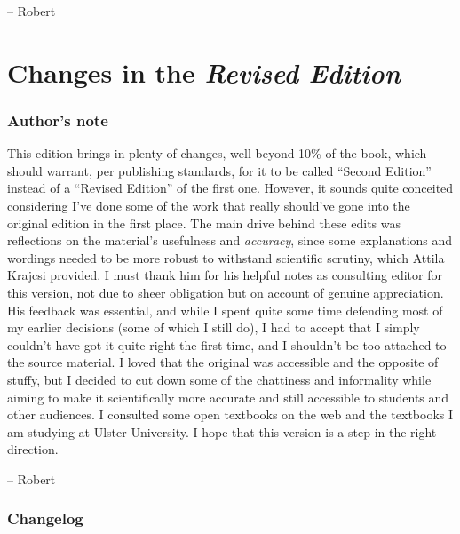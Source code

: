 \documentclass[
  11pt,
]{book}
\theoremstyle{indenteddefinition}
\theoremstyle{indenteddefinition}
\theoremstyle{definition}
\theoremstyle{definition}
\theoremstyle{remark}
\begin{document}
-- Robert

\hypertarget{changes-in-the-revised-edition}{%
\section*{\texorpdfstring{Changes in the \emph{Revised Edition}}{Changes in the Revised Edition}}\label{changes-in-the-revised-edition}}

\hypertarget{authors-note}{%
\subsubsection*{Author's note}\label{authors-note}}

This edition brings in plenty of changes, well beyond 10\% of the book, which should warrant, per publishing standards, for it to be called ``Second Edition'' instead of a ``Revised Edition'' of the first one. However, it sounds quite conceited considering I've done some of the work that really should've gone into the original edition in the first place. The main drive behind these edits was reflections on the material's usefulness and \emph{accuracy}, since some explanations and wordings needed to be more robust to withstand scientific scrutiny, which Attila Krajcsi provided. I must thank him for his helpful notes as consulting editor for this version, not due to sheer obligation but on account of genuine appreciation. His feedback was essential, and while I spent quite some time defending most of my earlier decisions (some of which I still do), I had to accept that I simply couldn't have got it quite right the first time, and I shouldn't be too attached to the source material. I loved that the original was accessible and the opposite of stuffy, but I decided to cut down some of the chattiness and informality while aiming to make it scientifically more accurate and still accessible to students and other audiences. I consulted some open textbooks on the web and the textbooks I am studying at Ulster University. I hope that this version is a step in the right direction.

-- Robert

\hypertarget{changelog}{%
\subsubsection*{Changelog}\label{changelog}}
\end{document}
